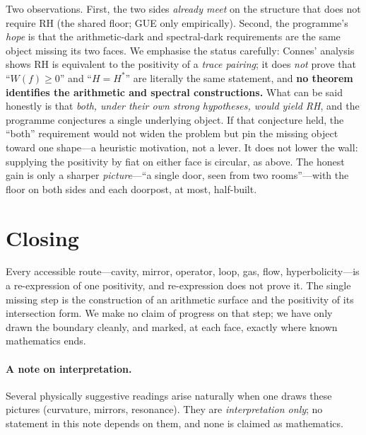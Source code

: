 \documentclass[11pt]{article}
\begin{document}
\noindent Two observations. First, the two sides \emph{already meet} on the structure
that does not require RH (the shared floor; GUE only empirically). Second, the
programme's \emph{hope} is that the arithmetic-dark and spectral-dark requirements are
the same object missing its two faces. We emphasise the status carefully: Connes'
analysis shows RH is equivalent to the positivity of a \emph{trace pairing}; it does
\emph{not} prove that ``$W(f)\ge 0$'' and ``$H=H^*$'' are literally the same statement,
and \textbf{no theorem identifies the arithmetic and spectral constructions.} What can
be said honestly is that \emph{both, under their own strong hypotheses, would yield RH},
and the programme conjectures a single underlying object. If that conjecture held, the
``both'' requirement would not widen the problem but pin the missing object toward one
shape---a heuristic motivation, not a lever. It does not lower the wall: supplying the
positivity by fiat on either face is circular, as above. The honest gain is only a
sharper \emph{picture}---``a single door, seen from two rooms''---with the floor on both
sides and each doorpost, at most, half-built.

\section{Closing}
Every accessible route---cavity, mirror, operator, loop, gas, flow, hyperbolicity---is
a re-expression of one positivity, and re-expression does not prove it. The single
missing step is the construction of an arithmetic surface and the positivity of its
intersection form. We make no claim of progress on that step; we have only drawn the
boundary cleanly, and marked, at each face, exactly where known mathematics ends.

\paragraph{A note on interpretation.} Several physically suggestive readings arise
naturally when one draws these pictures (curvature, mirrors, resonance). They are
\emph{interpretation only}; no statement in this note depends on them, and none is
claimed as mathematics.
\end{document}
